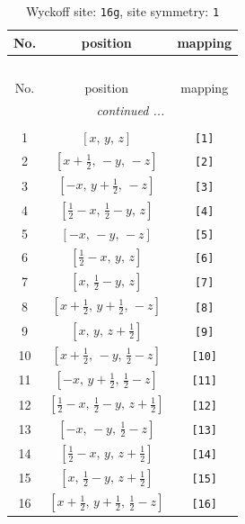 \documentclass[fleqn,8pt]{jsarticle}
\begin{document}
\begin{longtable}{ccc}
\caption{Wyckoff site: {\tt 16g}, site symmetry: {\tt 1}}
 \\
 \hline \hline
No. & position & mapping \\ \hline \endfirsthead

\multicolumn{2}{l}{\tablename\ \thetable{}} \\
 \hline \hline
No. & position & mapping \\ \hline \endhead

 \hline \hline
\multicolumn{2}{r}{\footnotesize\it continued ...} \\ \endfoot

 \hline \hline
\multicolumn{2}{r}{} \\ \endlastfoot

1 & $\left[ x,\, y,\, z \right]$ & {\tt [1]} \\ \hline
2 & $\left[ x + \frac{1}{2},\, - y,\, - z \right]$ & {\tt [2]} \\ \hline
3 & $\left[ - x,\, y + \frac{1}{2},\, - z \right]$ & {\tt [3]} \\ \hline
4 & $\left[ \frac{1}{2} - x,\, \frac{1}{2} - y,\, z \right]$ & {\tt [4]} \\ \hline
5 & $\left[ - x,\, - y,\, - z \right]$ & {\tt [5]} \\ \hline
6 & $\left[ \frac{1}{2} - x,\, y,\, z \right]$ & {\tt [6]} \\ \hline
7 & $\left[ x,\, \frac{1}{2} - y,\, z \right]$ & {\tt [7]} \\ \hline
8 & $\left[ x + \frac{1}{2},\, y + \frac{1}{2},\, - z \right]$ & {\tt [8]} \\ \hline
9 & $\left[ x,\, y,\, z + \frac{1}{2} \right]$ & {\tt [9]} \\ \hline
10 & $\left[ x + \frac{1}{2},\, - y,\, \frac{1}{2} - z \right]$ & {\tt [10]} \\ \hline
11 & $\left[ - x,\, y + \frac{1}{2},\, \frac{1}{2} - z \right]$ & {\tt [11]} \\ \hline
12 & $\left[ \frac{1}{2} - x,\, \frac{1}{2} - y,\, z + \frac{1}{2} \right]$ & {\tt [12]} \\ \hline
13 & $\left[ - x,\, - y,\, \frac{1}{2} - z \right]$ & {\tt [13]} \\ \hline
14 & $\left[ \frac{1}{2} - x,\, y,\, z + \frac{1}{2} \right]$ & {\tt [14]} \\ \hline
15 & $\left[ x,\, \frac{1}{2} - y,\, z + \frac{1}{2} \right]$ & {\tt [15]} \\ \hline
16 & $\left[ x + \frac{1}{2},\, y + \frac{1}{2},\, \frac{1}{2} - z \right]$ & {\tt [16]} \\
\end{longtable}
\end{document}
